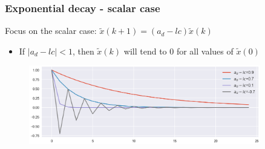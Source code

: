 
\begin{frame}
	\frametitle{Exponential decay - scalar case}
	Focus on the scalar case: $\tilde{x}(k+1)= (a_d-lc)\tilde{x}(k)$	
	\begin{itemize}
		\item If $|a_d-lc|<1$, then $\tilde{x}(k)$ will tend to 0 for all values of $\tilde{x}(0)$
	\end{itemize}

	\begin{figure}[b]
		\includegraphics[width=0.9\textwidth]{fig/exponential_decay}
	\end{figure}
	
	
	
\end{frame}

